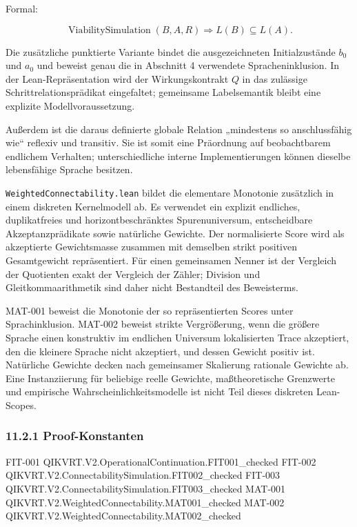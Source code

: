 \documentclass[
  10pt,
  a4paper,
]{article}
\newenvironment{Shaded}{}{}
\newcommand{\NormalTok}[1]{#1}
\begin{document}
Formal:

\[
\operatorname{ViabilitySimulation}(B,A,R)
\Longrightarrow
L(B)\subseteq L(A).
\]

Die zusätzliche punktierte Variante bindet die ausgezeichneten
Initialzustände \(b_0\) und \(a_0\) und beweist genau die in Abschnitt 4
verwendete Spracheninklusion. In der Lean-Repräsentation wird der
Wirkungskontrakt \(Q\) in das zulässige Schrittrelationsprädikat
eingefaltet; gemeinsame Labelsemantik bleibt eine explizite
Modellvoraussetzung.

Außerdem ist die daraus definierte globale Relation „mindestens so
anschlussfähig wie`` reflexiv und transitiv. Sie ist somit eine
Präordnung auf beobachtbarem endlichem Verhalten; unterschiedliche
interne Implementierungen können dieselbe lebensfähige Sprache besitzen.

\texttt{WeightedConnectability.lean} bildet die elementare Monotonie
zusätzlich in einem diskreten Kernelmodell ab. Es verwendet ein explizit
endliches, duplikatfreies und horizontbeschränktes Spurenuniversum,
entscheidbare Akzeptanzprädikate sowie natürliche Gewichte. Der
normalisierte Score wird als akzeptierte Gewichtsmasse zusammen mit
demselben strikt positiven Gesamtgewicht repräsentiert. Für einen
gemeinsamen Nenner ist der Vergleich der Quotienten exakt der Vergleich
der Zähler; Division und Gleitkommaarithmetik sind daher nicht Bestandteil
des Beweisterms.

MAT-001 beweist die Monotonie der so repräsentierten Scores unter
Sprachinklusion. MAT-002 beweist strikte Vergrößerung, wenn die größere
Sprache einen konstruktiv im endlichen Universum lokalisierten Trace
akzeptiert, den die kleinere Sprache nicht akzeptiert, und dessen Gewicht
positiv ist. Natürliche Gewichte decken nach gemeinsamer Skalierung
rationale Gewichte ab. Eine Instanziierung für beliebige reelle Gewichte,
maßtheoretische Grenzwerte und empirische Wahrscheinlichkeitsmodelle ist
nicht Teil dieses diskreten Lean-Scopes.

\hypertarget{proof-konstanten}{%
\subsubsection{11.2.1 Proof-Konstanten}\label{proof-konstanten}}

\begin{Shaded}
\begin{Highlighting}[]
\NormalTok{FIT{-}001  QIKVRT.V2.OperationalContinuation.FIT001\_checked}
\NormalTok{FIT{-}002  QIKVRT.V2.ConnectabilitySimulation.FIT002\_checked}
\NormalTok{FIT{-}003  QIKVRT.V2.ConnectabilitySimulation.FIT003\_checked}
\NormalTok{MAT{-}001  QIKVRT.V2.WeightedConnectability.MAT001\_checked}
\NormalTok{MAT{-}002  QIKVRT.V2.WeightedConnectability.MAT002\_checked}
\end{Highlighting}
\end{Shaded}
\end{document}
